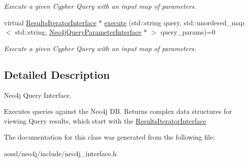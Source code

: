 \begin{DoxyCompactItemize}
\begin{DoxyCompactList}\small\item\em Execute a given Cypher Query with an input map of parameters. \end{DoxyCompactList}\item 
virtual \hyperlink{classResultsIteratorInterface}{Results\+Iterator\+Interface} $\ast$ \hyperlink{classNeo4jInterface_ad4abc507257157f08a562d1d1c76d7ce}{execute} (std\+::string query, std\+::unordered\+\_\+map$<$ std\+::string, \hyperlink{classNeo4jQueryParameterInterface}{Neo4j\+Query\+Parameter\+Interface} $\ast$ $>$ query\+\_\+params)=0\hypertarget{classNeo4jInterface_ad4abc507257157f08a562d1d1c76d7ce}{}\label{classNeo4jInterface_ad4abc507257157f08a562d1d1c76d7ce}

\begin{DoxyCompactList}\small\item\em Execute a given Cypher Query with an input map of parameters. \end{DoxyCompactList}\end{DoxyCompactItemize}


\subsection{Detailed Description}
Neo4j Query Interface. 

Executes queries against the Neo4j DB. Returns complex data structures for viewing Query results, which start with the \hyperlink{classResultsIteratorInterface}{Results\+Iterator\+Interface} 

The documentation for this class was generated from the following file\+:\begin{DoxyCompactItemize}
\item 
aossl/neo4j/include/neo4j\+\_\+interface.\+h\end{DoxyCompactItemize}

